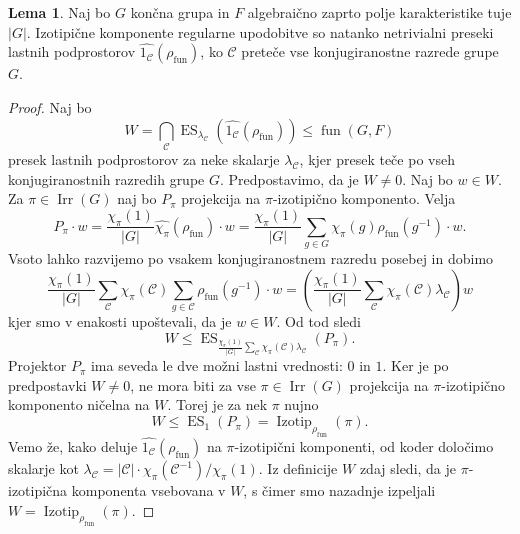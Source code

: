 \documentclass[11pt]{book}
\def\conclass{\mathcal{C}}
\DeclareMathOperator\Izotip{Izotip}
\DeclareMathOperator\Irr{Irr}
\DeclareMathOperator\Eigenspace{ES}
\DeclareMathOperator\fun{fun}
\theoremstyle{definition}
\theoremstyle{zgled}
\theoremstyle{odprtproblem}
\theoremstyle{domacanaloga}
\newenvironment{dokaz}
    {\color{siva}\begin{proof}}
    {\end{proof}}
\theoremstyle{izrek}
\newtheorem*{lema}{Lema}
\begin{document}
\begin{lema}
Naj bo $G$ končna grupa in $F$ algebraično zaprto polje karakteristike tuje $|G|$. Izotipične komponente regularne upodobitve so natanko netrivialni preseki lastnih podprostorov $\widehat{1_{\conclass}}(\rho_{\fun})$, ko $\conclass$ preteče vse konjugiranostne razrede grupe $G$.
\end{lema}
\begin{dokaz}
Naj bo
\[
    \textstyle W = \bigcap_{\conclass} \Eigenspace_{\lambda_{\conclass}}\left(\widehat{1_{\conclass}}(\rho_{\fun})\right) \leq \fun(G,F)
\]
presek lastnih podprostorov za neke skalarje $\lambda_{\conclass}$, kjer presek teče po vseh konjugiranostnih razredih grupe $G$. Predpostavimo, da je $W \neq 0$. Naj bo $w \in W$. Za $\pi \in \Irr(G)$ naj bo $P_{\pi}$ projekcija na $\pi$-izotipično komponento. Velja
\[
    P_{\pi} \cdot w = \frac{\chi_{\pi}(1)}{|G|} \widehat{\chi_{\pi}}(\rho_{\fun}) \cdot w =
    \frac{\chi_{\pi}(1)}{|G|} \sum_{g \in G} \chi_{\pi}(g) \rho_{\fun}(g^{-1}) \cdot w.
\]
Vsoto lahko razvijemo po vsakem konjugiranostnem razredu posebej in dobimo
\[
    \frac{\chi_{\pi}(1)}{|G|} \sum_{\conclass} \chi_{\pi}(\conclass) \sum_{g \in \conclass} \rho_{\fun}(g^{-1}) \cdot w =
    \left( \frac{\chi_{\pi}(1)}{|G|} \sum_{\conclass} \chi_{\pi}(\conclass) \lambda_{\conclass} \right) w
\]
kjer smo v enakosti upoštevali, da je $w \in W$. Od tod sledi
\[
    \textstyle W \leq \Eigenspace_{\frac{\chi_{\pi}(1)}{|G|} \sum_{\conclass} \chi_{\pi}(\conclass) \lambda_{\conclass}}(P_{\pi}).
\]
Projektor $P_{\pi}$ ima seveda le dve možni lastni vrednosti: $0$ in $1$. Ker je po predpostavki $W \neq 0$, ne mora biti za vse $\pi \in \Irr(G)$ projekcija na $\pi$-izotipično komponento ničelna na $W$. Torej je za nek $\pi$ nujno
\[
    \textstyle W \leq \Eigenspace_{1}(P_{\pi}) = \Izotip_{\rho_{\fun}}(\pi).
\]
Vemo že, kako deluje $\widehat{1_{\conclass}}(\rho_{\fun})$ na $\pi$-izotipični komponenti, od koder določimo skalarje kot $\lambda_{\conclass} = |\conclass| \cdot \chi_{\pi}(\conclass^{-1})/\chi_{\pi}(1)$. Iz definicije $W$ zdaj sledi, da je $\pi$-izotipična komponenta vsebovana v $W$, s čimer smo nazadnje izpeljali $W = \Izotip_{\rho_{\fun}}(\pi)$.
\end{dokaz}
\end{document}
